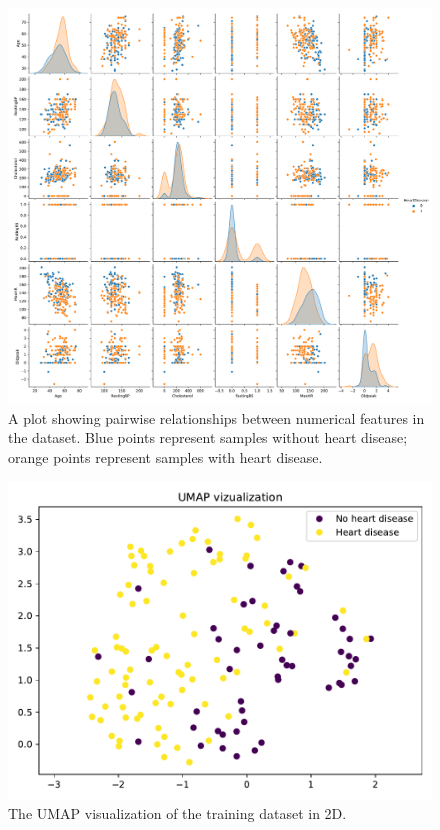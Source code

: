 \begin{figure}
    \centering
    \includegraphics[width=1\textwidth]{images/pairplot.pdf}
    \caption{A plot showing pairwise relationships between numerical features in the dataset. Blue points represent samples without heart disease; orange points represent samples with heart disease.}
    \label{fig:pairplot}
\end{figure}

\begin{figure}
    \centering
    \includegraphics[width=1\columnwidth]{images/umap.pdf}
    \caption{The UMAP visualization \cite{mcinnesUMAPUniformManifold2020} of the training dataset in 2D.}
    \label{fig:umap}
\end{figure}

